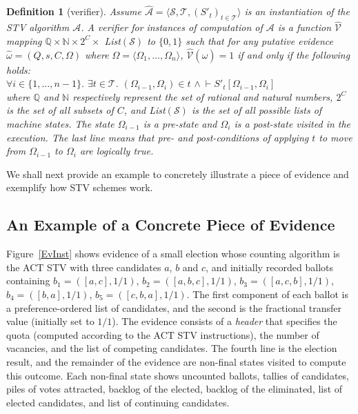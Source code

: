 \documentclass[10pt,conference]{IEEEtran}
\newtheorem{definition}{Definition}
\begin{document}
\begin{definition}[verifier]\label{verifier}
Assume $\hat{\mathcal{A}}= \langle \mathcal{S}, \mathcal{T},
(S'_t)_{t \in \mathcal{T}} \rangle$ is an instantiation of the STV
algorithm $\mathcal{A}$. A \emph{verifier} for instances of
computation of $\mathcal{A}$ is a function $\hat{\mathcal{V}}$
mapping $\mathbb{Q}\times\mathbb{N}\times 2^{C}\times$
\textsf{List}$(\mathcal{S})$ to $\{0,1\}$ such that for any putative evidence $\hat{\omega} = (Q,s,C,\Omega)$ where $\Omega=\langle\Omega_{1},\dots,\Omega_{n}\rangle$, $\hat{\mathcal{V}}(\hat{\omega}) = 1$ if and only if the following holds:\\
$\forall i\in\{1,\dots,n-1\}.$ 
$\exists t\in\mathcal{T}.$  $(\Omega_{i-1},\Omega_{i})\in t$ $\wedge~\vdash S'_{t}[\Omega_{i-1},\Omega_{i}]$\\ 
where $\mathbb{Q}$ and $\mathbb{N}$ respectively represent the set
of rational and natural numbers, $2^{C}$ is the set of all subsets
of $C$, and \textsf{List}$(\mathcal{S})$ is the set of all possible
lists of machine states. The state $\Omega_{i-1}$ is a pre-state and $\Omega_{i}$ is a post-state visited in the execution. The last line means that pre- and post-conditions  of applying $t$ to move from $\Omega_{i-1}$ to $\Omega_{i}$  are logically true. 
\end{definition} 
We shall next provide an example to concretely illustrate a piece of evidence and exemplify how STV schemes work. 
 \subsection{An Example of a Concrete Piece of Evidence}
\label{subsec:InstEv}
\noindent
Figure~\ref{EvInst} shows evidence of a small election whose counting algorithm is the ACT STV 
with three candidates $a$, $b$ and $c$, and initially recorded ballots containing
$b_1=([a,c],1/1)$, $b_2=([a,b,c],1/1)$, $b_3=([a,c,b],1/1)$,
$b_4=([b,a],1/1)$, $b_5=([c,b,a],1/1)$.  The first component of each ballot is a preference-ordered list of candidates, and the second is the fractional transfer value (initially set to $1/1$). The evidence consists of a \emph{header} that specifies the quota (computed according to the ACT STV instructions), the number of vacancies, and the list of competing candidates. 
The fourth line is the election result, and the remainder of the evidence are non-final states visited to compute this
outcome. Each non-final state shows uncounted ballots, tallies of candidates, piles of votes attracted, backlog of the elected, backlog of the eliminated, list of elected candidates, and list of continuing candidates. 
\end{document}
